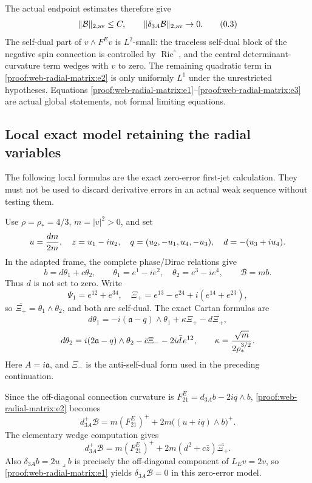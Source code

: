 The actual endpoint estimates therefore give \[
 \|\mathcal B\|_{2,\rm av}\le C,
 \qquad \|\delta_{3A}\mathcal B\|_{2,\rm av}\to0.
 \tag{\thesection.3}\label{proof:web-radial-matrix:e3}
\] The self-dual part of \(v\wedge F^Ev\) is \(L^2\)-small: the traceless self-dual block of the negative spin connection is controlled by \(\operatorname{Ric}^{\circ}\), and the central determinant-curvature term wedges with \(v\) to zero. The remaining quadratic term in \eqref{proof:web-radial-matrix:e2} is only uniformly \(L^1\) under the unrestricted hypotheses. Equations \eqref{proof:web-radial-matrix:e1}–\eqref{proof:web-radial-matrix:e3} are actual global statements, not formal limiting equations.

\hypertarget{proof:web-radial-matrix:s2}{%
\subsection{Local exact model retaining the radial variables}\label{proof:web-radial-matrix:s2}}

The following local formulas are the exact zero-error first-jet calculation. They must not be used to discard derivative errors in an actual weak sequence without testing them.

Use \(\rho=\rho_*=4/3\), \(m=|v|^2>0\), and set \[
 u={dm\over2m},\quad z=u_1-iu_2,\quad
 q=(u_2,-u_1,u_4,-u_3),\quad d=-(u_3+iu_4).
\] In the adapted frame, the complete phase/Dirac relations give \[
 b=d\theta_1+c\theta_2,
 \qquad \theta_1=e^1-ie^2,\quad\theta_2=e^3-ie^4,
 \qquad \mathcal B=mb.
 \tag{\thesection.4}\label{proof:web-radial-matrix:e4}
\] Thus \(d\) is not set to zero. Write \[
 \Psi_1=e^{12}+e^{34},\quad
 \Xi_+=e^{13}-e^{24}+i(e^{14}+e^{23}),
\] so \(\overline{\Xi_+}=\theta_1\wedge\theta_2\), and both are self-dual. The exact Cartan formulas are \[
 d\theta_1=-i(\mathfrak a-q)\wedge\theta_1
                 +\kappa\Xi_+-d\overline{\Xi_+},
\] \[
 d\theta_2=i(2\mathfrak a-q)\wedge\theta_2
                 -\bar c\Xi_- -2i\bar d\,e^{12},
 \qquad \kappa={\sqrt m\over2\rho_*^{3/2}}.
\] Here \(A=i\mathfrak a\), and \(\Xi_-\) is the anti-self-dual form used in the preceding continuation.

Since the off-diagonal connection curvature is \(F^E_{21}=d_{3A}b-2iq\wedge b\), \eqref{proof:web-radial-matrix:e2} becomes \[
 d_{3A}^+\mathcal B
 =m(F^E_{21})^++2m\bigl((u+iq)\wedge b\bigr)^+.
\] The elementary wedge computation gives \[
 \boxed{d_{3A}^+\mathcal B
 =m(F^E_{21})^++2m(d^2+c\bar z)\overline{\Xi_+}.}
 \tag{\thesection.5}\label{proof:web-radial-matrix:e5}
\] Also \(\delta_{3A}b=2u\mathbin{\lrcorner}b\) is precisely the off-diagonal component of \(L_Ev=2v\), so \eqref{proof:web-radial-matrix:e1} yields \(\delta_{3A}\mathcal B=0\) in this zero-error model.

